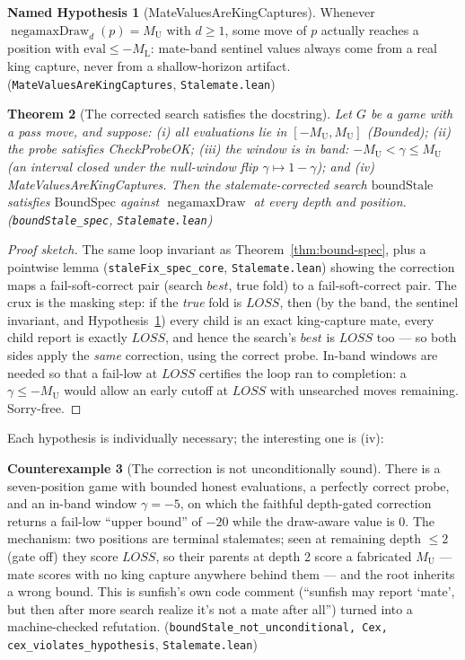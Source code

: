 \documentclass[11pt]{article}
\DeclareMathOperator{\negamaxD}{negamaxDraw}
\newcommand{\MU}{M_{\mathrm{U}}}    %
\newcommand{\ML}{M_{\mathrm{L}}}    %
\newcommand{\LOSS}{\mathit{LOSS}}   %
\newcommand{\leanref}[2]{(\texttt{#1}, \texttt{#2})}%
\theoremstyle{plain}
\newtheorem{theorem}{Theorem}[section]
\theoremstyle{definition}
\newtheorem{hypothesis}[theorem]{Named Hypothesis}
\newtheorem{counterexample}[theorem]{Counterexample}
\theoremstyle{remark}
\begin{document}
\begin{hypothesis}[MateValuesAreKingCaptures]
\label{hyp:mvakc}
Whenever $\negamaxD_d(p) = \MU$ with $d \ge 1$, some move of $p$
actually reaches a position with $\mathrm{eval} \le -\ML$: mate-band
sentinel values always come from a real king capture, never from a
shallow-horizon artifact.
\leanref{MateValuesAreKingCaptures}{Stalemate.lean}
\end{hypothesis}

\begin{theorem}[The corrected search satisfies the docstring]
\label{thm:boundstale}
Let $G$ be a game with a pass move, and suppose:
(i) all evaluations lie in $[-\MU, \MU]$ (\emph{Bounded});
(ii) the probe satisfies \emph{CheckProbeOK};
(iii) the window is in band: $-\MU < \gamma \le \MU$ (an interval closed
under the null-window flip $\gamma \mapsto 1-\gamma$); and
(iv) \emph{MateValuesAreKingCaptures}.
Then the stalemate-corrected search $\mathrm{boundStale}$ satisfies
$\mathrm{BoundSpec}$ against $\negamaxD$ at every depth and position.
\leanref{boundStale\_spec}{Stalemate.lean}
\end{theorem}

\begin{proof}[Proof sketch]
The same loop invariant as Theorem~\ref{thm:bound-spec}, plus a
pointwise lemma \leanref{staleFix\_spec\_core}{Stalemate.lean} showing
the correction maps a fail-soft-correct pair (search $\mathit{best}$,
true fold) to a fail-soft-correct pair.  The crux is the masking step:
if the \emph{true} fold is $\LOSS$, then (by the band, the sentinel
invariant, and Hypothesis~\ref{hyp:mvakc}) every child is an exact
king-capture mate, every child report is exactly $\LOSS$, and hence the
search's $\mathit{best}$ is $\LOSS$ too --- so both sides apply the
\emph{same} correction, using the correct probe.  In-band windows are
needed so that a fail-low at $\LOSS$ certifies the loop ran to
completion: a $\gamma \le -\MU$ would allow an early cutoff at
$\LOSS$ with unsearched moves remaining.  Sorry-free.
\end{proof}

Each hypothesis is individually necessary; the interesting one is (iv):

\begin{counterexample}[The correction is not unconditionally sound]
\label{cex:stale}
There is a seven-position game with bounded honest evaluations, a
perfectly correct probe, and an in-band window $\gamma = -5$, on which
the faithful depth-gated correction returns a fail-low ``upper bound''
of $-20$ while the draw-aware value is $0$.  The mechanism: two
positions are terminal stalemates; seen at remaining depth $\le 2$ (gate
off) they score $\LOSS$, so their parents at depth 2 score a fabricated
$\MU$ --- mate scores with no king capture anywhere behind them --- and
the root inherits a wrong bound.  This is sunfish's own code comment
(``sunfish may report `mate', but then after more search realize it's
not a mate after all'') turned into a machine-checked refutation.
\leanref{boundStale\_not\_unconditional, Cex, cex\_violates\_hypothesis}{Stalemate.lean}
\end{counterexample}
\end{document}
